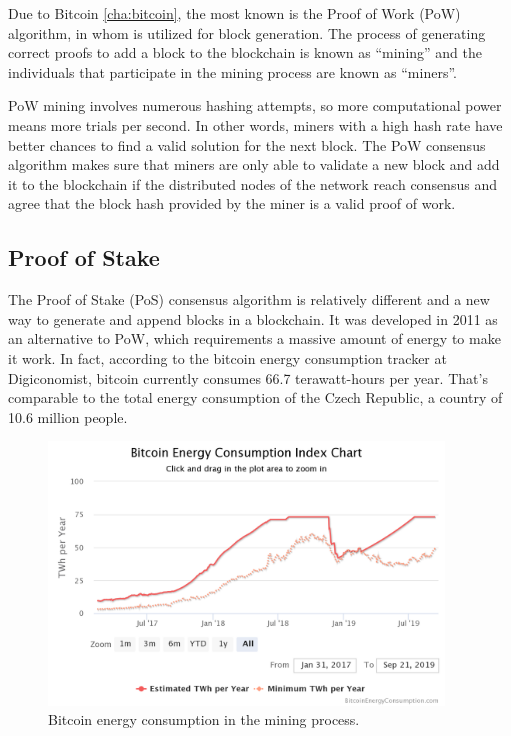 Due to Bitcoin \ref{cha:bitcoin}, the most known is the Proof of 
Work (PoW) algorithm, in whom is utilized for block generation. 
The process of generating correct proofs to add a block 
to the blockchain is known as “mining” and the individuals that 
participate in the mining process are known as “miners”.\cite{consensusmedium}

PoW mining involves numerous hashing attempts, so more computational 
power means more trials per second. In other words, miners with a high 
hash rate have better chances to find a valid solution for the next 
block. The PoW consensus algorithm makes sure that miners are only able 
to validate a new block and add it to the blockchain if 
the distributed nodes of the network reach consensus and agree that the 
block hash provided by the miner is a valid proof of work.\cite{binancevision}

\subsection{Proof of Stake}
\label{sec:pos}

The Proof of Stake (PoS) consensus algorithm 
is relatively different and a new way to generate and append blocks in a 
blockchain. It was developed in 2011 as an alternative to PoW, which requirements
a massive amount of energy to make it work. In fact, according to the 
bitcoin energy consumption tracker at Digiconomist\cite{digiconomist}, 
bitcoin currently consumes 66.7 terawatt-hours per year. That’s comparable 
to the total energy consumption of the Czech Republic, a country 
of 10.6 million people.

\begin{figure}[h]
    \centering
    \includegraphics[height=7cm]{energy.png}
    \caption{Bitcoin energy consumption in the mining process.\cite{digiconomist}}
    \label{fig:energy}
\end{figure}

